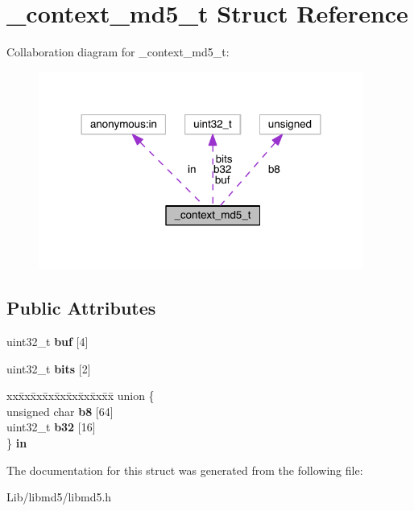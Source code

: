 \hypertarget{struct__context__md5__t}{}\section{\+\_\+context\+\_\+md5\+\_\+t Struct Reference}
\label{struct__context__md5__t}


Collaboration diagram for \+\_\+context\+\_\+md5\+\_\+t\+:
\nopagebreak
\begin{figure}[H]
\begin{center}
\leavevmode
\includegraphics[width=302pt]{d2/dfc/struct__context__md5__t__coll__graph}
\end{center}
\end{figure}
\subsection*{Public Attributes}
\begin{DoxyCompactItemize}
\item 
\mbox{\label{struct__context__md5__t_a5587845ac35afcdcf8e0455ed8f0cf17}} 
uint32\+\_\+t {\bfseries buf} \mbox{[}4\mbox{]}
\item 
\mbox{\label{struct__context__md5__t_a659f4871283f01952f940d92874362cc}} 
uint32\+\_\+t {\bfseries bits} \mbox{[}2\mbox{]}
\item 
\mbox{\label{struct__context__md5__t_a1d8de42dabaab4442741a50dd9c338c0}} 
\begin{tabbing}
xx\=xx\=xx\=xx\=xx\=xx\=xx\=xx\=xx\=\kill
union \{\\
\>unsigned char {\bfseries b8} \mbox{[}64\mbox{]}\\
\>uint32\_t {\bfseries b32} \mbox{[}16\mbox{]}\\
\} {\bfseries in}\\

\end{tabbing}\end{DoxyCompactItemize}


The documentation for this struct was generated from the following file\+:\begin{DoxyCompactItemize}
\item 
Lib/libmd5/libmd5.\+h\end{DoxyCompactItemize}
